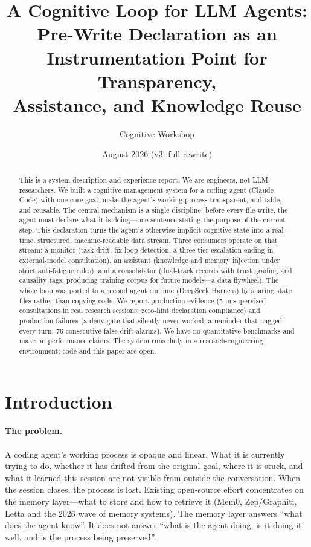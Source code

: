 \documentclass{article}
\title{A Cognitive Loop for LLM Agents:\\
Pre-Write Declaration as an Instrumentation Point for Transparency,\\
Assistance, and Knowledge Reuse}
\author{Cognitive Workshop}
\date{August 2026 (v3: full rewrite)}
\begin{document}
\maketitle

\begin{abstract}
This is a system description and experience report. We are engineers, not LLM researchers. We built a cognitive management system for a coding agent (Claude Code) with one core goal: make the agent's working process transparent, auditable, and reusable. The central mechanism is a single discipline: before every file write, the agent must declare what it is doing---one sentence stating the purpose of the current step. This declaration turns the agent's otherwise implicit cognitive state into a real-time, structured, machine-readable data stream. Three consumers operate on that stream: a monitor (task drift, fix-loop detection, a three-tier escalation ending in external-model consultation), an assistant (knowledge and memory injection under strict anti-fatigue rules), and a consolidator (dual-track records with trust grading and causality tags, producing training corpus for future models---a data flywheel). The whole loop was ported to a second agent runtime (DeepSeek Harness) by sharing state files rather than copying code. We report production evidence (5 unsupervised consultations in real research sessions; zero-hint declaration compliance) and production failures (a deny gate that silently never worked; a reminder that nagged every turn; 76 consecutive false drift alarms). We have no quantitative benchmarks and make no performance claims. The system runs daily in a research-engineering environment; code and this paper are open.
\end{abstract}

\section{Introduction}

\paragraph{The problem.}
A coding agent's working process is opaque and linear. What it is currently trying to do, whether it has drifted from the original goal, where it is stuck, and what it learned this session are not visible from outside the conversation. When the session closes, the process is lost. Existing open-source effort concentrates on the memory layer---what to store and how to retrieve it (Mem0, Zep/Graphiti, Letta and the 2026 wave of memory systems). The memory layer answers ``what does the agent know''. It does not answer ``what is the agent doing, is it doing it well, and is the process being preserved''.
\end{document}
